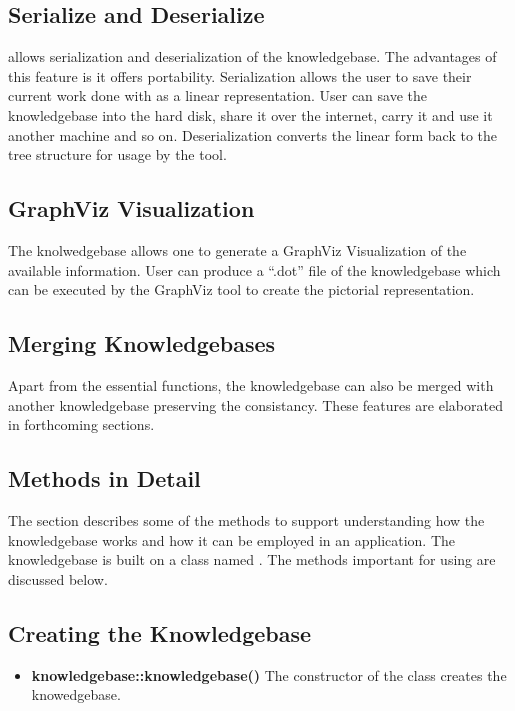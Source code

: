 \subsection*{Serialize and Deserialize} 
\libalf allows serialization and deserialization of the knowledgebase. The advantages of this feature is it offers portability. Serialization allows the user to save their current work done with \libalf as a linear representation. User can save the knowledgebase into the hard disk, share it over the internet, carry it and use it another machine and so on. Deserialization converts the linear form back to the tree structure for usage by the \libalf tool.

\subsection*{GraphViz Visualization} 
The knolwedgebase allows one to generate a GraphViz Visualization of the available information. User can produce a ``.dot'' file of the knowledgebase which can be executed by the GraphViz tool to create the pictorial representation.

\subsection*{Merging Knowledgebases} 
Apart from the essential functions, the knowledgebase can also be merged with another knowledgebase preserving the consistancy. These features are elaborated in forthcoming sections.

\subsection{Methods in Detail}
The section describes some of the methods to support understanding how the knowledgebase works and how it can be employed in an application. The knowledgebase is built on a class named \knowledgebase. The methods important for using \libalf are discussed below.
	
\subsection*{Creating the Knowledgebase}

\begin{itemize}
 \item \textbf{knowledgebase::knowledgebase()} \vskip 1pt
	The constructor of the \knowledgebase class creates the knowedgebase.
\end{itemize}
	
